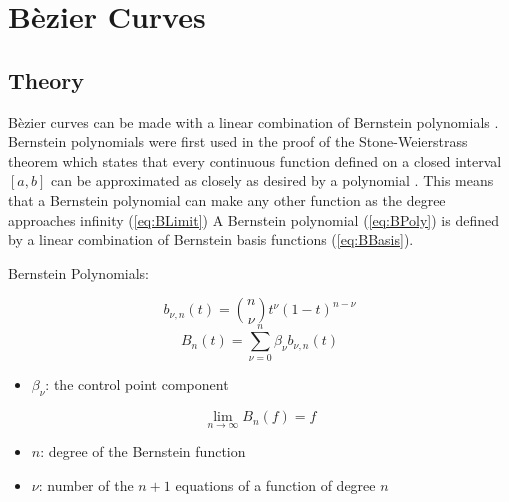 \documentclass[12pt, letterpaper]{article}
\begin{document}
\section{B\`ezier Curves}
\subsection{Theory}
B\`ezier curves can be made with a linear combination of Bernstein polynomials \citep{ams}. Bernstein
polynomials were first used in the proof of the Stone-Weierstrass theorem which states that every continuous
function defined on a closed interval $[a,b]$ can be approximated as closely as desired by a polynomial
\citep{weierstrass}. This means that a Bernstein polynomial can make any other function as the degree
approaches infinity (\ref{eq:BLimit}) A Bernstein polynomial (\ref{eq:BPoly}) is defined by a linear combination of Bernstein
basis functions (\ref{eq:BBasis}).

Bernstein Polynomials:
\begin{singlespace}
  \begin{equation}
    \label{eq:BBasis}
    b_{\nu,n}(t) = {n \choose \nu} t^\nu (1 - t)^{n - \nu}
  \end{equation}
  \begin{equation}
    \label{eq:BPoly}
    B_n(t) = \sum_{\nu = 0}^{n}\beta_\nu b_{\nu,n} (t)
  \end{equation}
  \begin{small}  
    \begin{itemize}[label=]
      \item $\beta_\nu$: the control point component
    \end{itemize}
  \end{small}
  \begin{equation}
    \label{eq:BLimit}
    \lim_{n\to\infty} B_n(f) = f
  \end{equation}
  \begin{small}
		\begin{itemize}[label=]
    	\item $n$: degree of the Bernstein function
    	\item $\nu$: number of the $n+1$ equations of a function of degree $n$ 
		\end{itemize}
  \end{small}
\end{singlespace}
\end{document}
